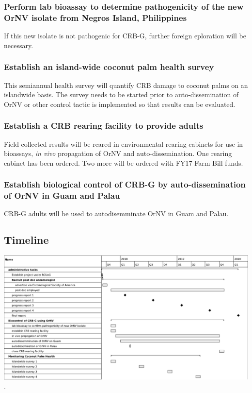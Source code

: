 \documentclass[12pt,letterpaper,english,bibliography=totocnumbered, abstract=on]{scrartcl}
\begin{document}
\subsubsection{Perform lab bioassay to determine pathogenicity of the new OrNV isolate
from Negros Island, Philippines}

If this new isolate is not pathogenic for CRB-G, further foreign eploration
will be necessary.

\subsubsection{Establish an island-wide coconut palm health survey}

This semiannual health survey will quantify CRB damage to coconut
palms on an islandwide basis. The survey needs to be started prior
to auto-dissemination of OrNV or other control tactic is implemented
so that results can be evaluated.

\subsubsection{Establish a CRB rearing facility to provide adults}

Field collected results will be reared in environmental rearing cabinets
for use in bioassays, \emph{in vivo} propagation of OrNV and auto-dissemination.
One rearing cabinet has been ordered. Two more will be ordered with
FY17 Farm Bill funds.

\subsubsection{Establish biological control of CRB-G by auto-dissemination of OrNV
in Guam and Palau}

CRB-G adults will be used to autodisemminate OrNV in Guam and Palau.

\subsection{Timeline}

\includegraphics[width=1\textwidth,height=1\textheight,keepaspectratio]{output}.
\end{document}
